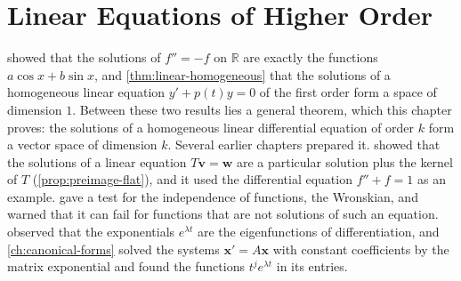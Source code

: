 \chapter{Linear Equations of Higher Order}
\label{ch:linear-higher-order}


 showed that the solutions of $f''=-f$ on $\mathbb R$ are exactly the functions $a\cos x+b\sin x$, and \cref{thm:linear-homogeneous} that the solutions of a homogeneous linear equation $y'+p(t)y=0$ of the first order form a space of dimension $1$. Between these two results lies a general theorem, which this chapter proves: the solutions of a homogeneous linear differential equation of order $k$ form a vector space of dimension $k$. Several earlier chapters prepared it.  showed that the solutions of a linear equation $T\mathbf v=\mathbf w$ are a particular solution plus the kernel of $T$ (\cref{prop:preimage-flat}), and it used the differential equation $f''+f=1$ as an example.  gave a test for the independence of functions, the Wronskian, and warned that it can fail for functions that are not solutions of such an equation.  observed that the exponentials $e^{\lambda t}$ are the eigenfunctions of differentiation, and \cref{ch:canonical-forms} solved the systems $\mathbf x'=A\mathbf x$ with constant coefficients by the matrix exponential and found the functions $t^je^{\lambda t}$ in its entries.

